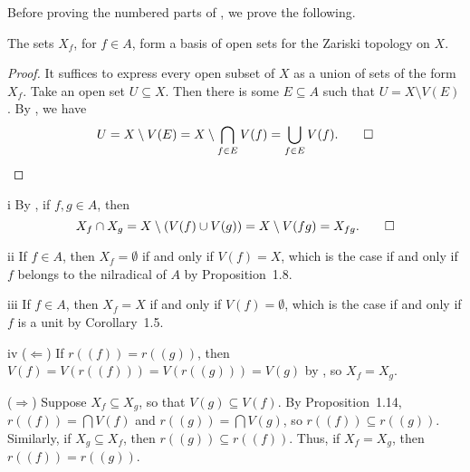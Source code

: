 Before proving the numbered parts of , we prove the following.

\begin{claim}
\label{claim:basic open sets for zariski topology}
The sets \(X_f\), for \(f \in A\), form a basis of open sets for the Zariski topology on \(X\).
\end{claim}

\begin{proof}
It suffices to express every open subset of \(X\) as a union of sets of the form \(X_f\).
Take an open set \(U \subseteq X\).
Then there is some \(E \subseteq A\) such that \(U = X \setminus V(E)\).
By , we have
\begin{equation*}
U
= X \setminus V(E)
= X \setminus \bigcap_{f \in E} V(f)
= \bigcup_{f \in E} V(f).
\qedhere
\end{equation*}
\end{proof}

\begin{partsolution}{i}
By , if \(f, g \in A\), then
\begin{equation*}
X_f \cap X_g = X \setminus (V(f) \cup V(g)) = X \setminus V(f g) = X_{f g}.
\qedhere
\end{equation*}
\end{partsolution}

\begin{partsolution}{ii}
If \(f \in A\), then \(X_f = \emptyset\) if and only if \(V(f) = X\), which is the case if and only if \(f\) belongs to the nilradical of \(A\) by Proposition~1.8.
\end{partsolution}

\begin{partsolution}{iii}
If \(f \in A\), then \(X_f = X\) if and only if \(V(f) = \emptyset\), which is the case if and only if \(f\) is a unit by Corollary~1.5.
\end{partsolution}

\begin{partsolution}{iv}
(\(\Leftarrow\))
If \(r((f)) = r((g))\), then \(V(f) = V(r((f))) = V(r((g))) = V(g)\) by , so \(X_f = X_g\).

(\(\Rightarrow\))
Suppose \(X_f \subseteq X_g\), so that \(V(g) \subseteq V(f)\).
By Proposition~1.14, \(r((f)) = \bigcap V(f)\) and \(r((g)) = \bigcap V(g)\), so \(r((f)) \subseteq r((g))\).
Similarly, if \(X_g \subseteq X_f\), then \(r((g)) \subseteq r((f))\).
Thus, if \(X_f = X_g\), then \(r((f)) = r((g))\).
\end{partsolution}

